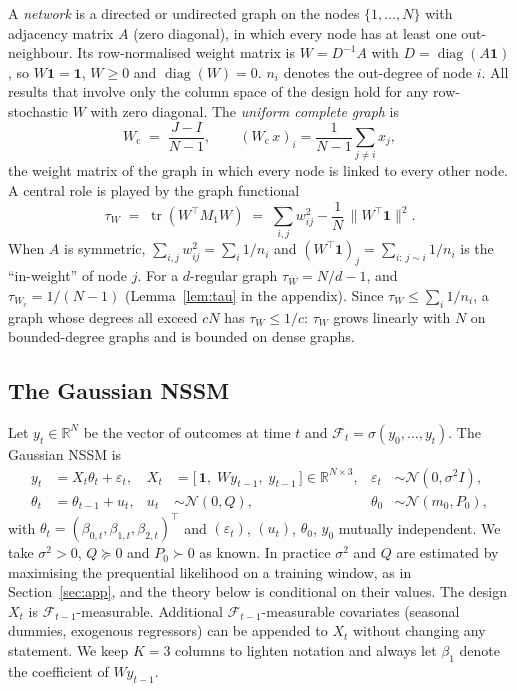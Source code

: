 \documentclass[12pt]{article}
\theoremstyle{plain}
\theoremstyle{definition}
\theoremstyle{remark}
\newcommand{\R}{\mathbb{R}}
\newcommand{\tr}{\operatorname{tr}}
\newcommand{\diag}{\operatorname{diag}}
\newcommand{\one}{\mathbf{1}}
\newcommand{\calF}{\mathcal{F}}
\newcommand{\calN}{\mathcal{N}}
\newcommand{\Wc}{W_{\mathrm{c}}}
\newcommand{\tauW}{\tau_W}
\newcommand{\T}{^{\top}}
\begin{document}
A \emph{network} is a directed or undirected graph on the nodes $\{1,\dots,N\}$ with adjacency matrix $A$ (zero diagonal), in which every node has at least one out-neighbour. Its row-normalised weight matrix is $W=D^{-1}A$ with $D=\diag(A\one)$, so $W\one=\one$, $W\ge 0$ and $\diag(W)=0$. $n_i$ denotes the out-degree of node $i$. All results that involve only the column space of the design hold for any row-stochastic $W$ with zero diagonal. The \emph{uniform complete graph} is
\begin{equation}\label{eq:Wc}
\Wc \;=\; \frac{J-I}{N-1},\qquad (\Wc\,x)_i=\frac{1}{N-1}\sum_{j\ne i}x_j ,
\end{equation}
the weight matrix of the graph in which every node is linked to every other node. A central role is played by the graph functional
\begin{equation}\label{eq:tau}
\tauW \;=\; \tr(W\T M_1 W)\;=\;\sum_{i,j}w_{ij}^2-\frac1N\,\|W\T\one\|^2 .
\end{equation}
When $A$ is symmetric, $\sum_{i,j}w_{ij}^2=\sum_i 1/n_i$ and $(W\T\one)_j=\sum_{i:\,j\sim i}1/n_i$ is the ``in-weight'' of node $j$. For a $d$-regular graph $\tauW=N/d-1$, and $\tau_{\Wc}=1/(N-1)$ (Lemma~\ref{lem:tau} in the appendix). Since $\tauW\le\sum_i 1/n_i$, a graph whose degrees all exceed $cN$ has $\tauW\le 1/c$: $\tauW$ grows linearly with $N$ on bounded-degree graphs and is bounded on dense graphs.

\subsection{The Gaussian NSSM}
Let $y_t\in\R^N$ be the vector of outcomes at time $t$ and $\calF_t=\sigma(y_0,\dots,y_t)$. The Gaussian NSSM is
\begin{align}
y_t &= X_t\theta_t+\varepsilon_t, & X_t &=\big[\,\one,\;W y_{t-1},\;y_{t-1}\,\big]\in\R^{N\times 3}, & \varepsilon_t&\sim\calN(0,\sigma^2 I),\label{eq:obs}\\
\theta_t &= \theta_{t-1}+u_t, & u_t&\sim\calN(0,Q), & \theta_0&\sim\calN(m_0,P_0),\label{eq:state}
\end{align}
with $\theta_t=(\beta_{0,t},\beta_{1,t},\beta_{2,t})\T$ and $(\varepsilon_t)$, $(u_t)$, $\theta_0$, $y_0$ mutually independent. We take $\sigma^2>0$, $Q\succeq0$ and $P_0\succ0$ as known. In practice $\sigma^2$ and $Q$ are estimated by maximising the prequential likelihood on a training window, as in Section~\ref{sec:app}, and the theory below is conditional on their values. The design $X_t$ is $\calF_{t-1}$-measurable. Additional $\calF_{t-1}$-measurable covariates (seasonal dummies, exogenous regressors) can be appended to $X_t$ without changing any statement. We keep $K=3$ columns to lighten notation and always let $\beta_1$ denote the coefficient of $Wy_{t-1}$.
\end{document}
